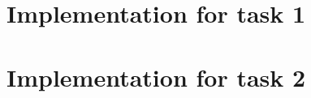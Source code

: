 \documentclass{article}
\begin{document}

\newpage

\section{Implementation for task 1}



\newpage

\section{Implementation for task 2}


\end{document}
